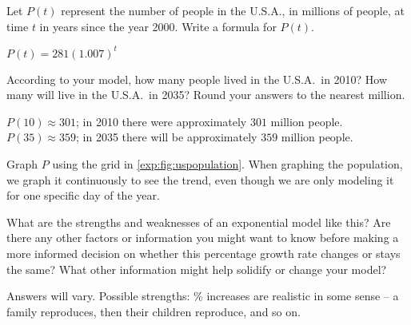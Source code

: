 \begin{exercises}
\begin{problem}[US population]
\begin{subproblem}
	Let $P(t)$ represent the number of people in the U.S.A., in millions of people, at time $t$ 
	in years since the year 2000. Write a formula for $P(t)$.
	\begin{shortsolution}
		$P(t)=281(1.007)^t$
	\end{shortsolution}
\end{subproblem}
\begin{subproblem}
	According to your model, how many people lived in the U.S.A.\ in 2010? How many will live in the 
	U.S.A.\ in 2035? 
	Round your answers to the nearest million.
	\begin{shortsolution}
		$P(10)\approx 301$; in 2010 there were approximately $301$ million people. $P(35)\approx 359$; in 2035 there will be  
		approximately $359$ million people.
	\end{shortsolution}
\end{subproblem}
\begin{subproblem}
	Graph $P$ using the grid in \cref{exp:fig:uspopulation}. When graphing the population, we graph it
	continuously to see the trend, even though we are only modeling it for one specific day of the year. 
	\begin{shortsolution}
	\end{shortsolution}
\end{subproblem}
			
			
\begin{subproblem}\label{exp:prob:uspopStrWeak}
	What are the strengths and weaknesses of an exponential model like this?
	Are there any other factors or information you might want to know before making 
	a more informed decision on whether this percentage growth rate changes or stays the same? What 
	other information might help solidify or change your model?
	\begin{shortsolution}
		Answers will vary.
		Possible strengths: \% increases are realistic in some sense -- a family reproduces, then 
		their children reproduce, and so on. 
																			

\end{shortsolution}
\end{subproblem}
\end{problem}
\end{exercises}
